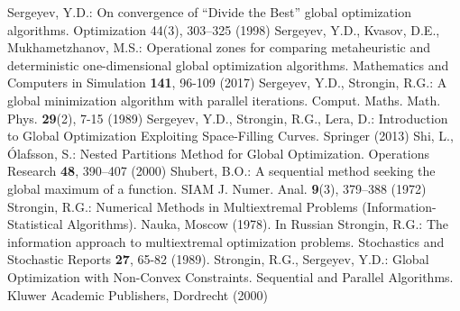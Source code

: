 \begin{thebibliography}{99.}
 Sergeyev, Y.D.: On convergence of “Divide the Best” global optimization algorithms. Optimization 44(3), 303--325 (1998)
 Sergeyev, Y.D., Kvasov, D.E., Mukhametzhanov, M.S.: Operational zones for comparing metaheuristic and deterministic one-dimensional global optimization algorithms. Mathematics and Computers in Simulation \textbf{141}, 96-109 (2017)
 Sergeyev, Y.D., Strongin, R.G.:  A global minimization algorithm with parallel iterations. Comput. Maths. Math. Phys. \textbf{29}(2), 7-15 (1989)
	Sergeyev, Y.D., Strongin, R.G., Lera, D.: Introduction to Global Optimization Exploiting Space-Filling Curves. Springer (2013)
   Shi, L., {\'O}lafsson, S.: Nested Partitions Method for Global Optimization. Operations Research \textbf{48}, 390--407 (2000)
 Shubert, B.O.: A sequential method seeking the global maximum of a function. SIAM J. Numer. Anal. \textbf{9}(3), 379--388 (1972)
	Strongin, R.G.: Numerical Methods in Multiextremal Problems (Information-Statistical Algorithms). Nauka, Moscow (1978). In Russian
 Strongin, R.G.: The information approach to multiextremal optimization problems. Stochastics and Stochastic Reports \textbf{27}, 65-82 (1989).
 Strongin, R.G., Sergeyev, Y.D.: Global Optimization with Non-Convex Constraints. Sequential and Parallel Algorithms. Kluwer Academic Publishers, Dordrecht (2000)

\end{thebibliography}
%
